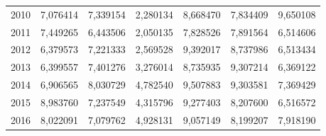\begin{table}
\begin{tabular}{p{1cm}p{2cm}p{2cm}p{2cm}p{2cm}p{2cm}p{2cm}}
 2010 &                               7,076414 &     7,339154 &                        2,280134 &             8,668470 &             7,834409 &                   9,650108 \\
 2011 &                               7,449265 &     6,443506 &                        2,050135 &             7,828526 &             7,891564 &                   6,514606 \\
 2012 &                               6,379573 &     7,221333 &                        2,569528 &             9,392017 &             8,737986 &                   6,513434 \\
 2013 &                               6,399557 &     7,401276 &                        3,276014 &             8,735935 &             9,307214 &                   6,369122 \\
 2014 &                               6,906565 &     8,030729 &                        4,782540 &             9,507883 &             9,303581 &                   7,369429 \\
 2015 &                               8,983760 &     7,237549 &                        4,315796 &             9,277403 &             8,207600 &                   6,516572 \\
 2016 &                               8,022091 &     7,079762 &                        4,928131 &             9,057149 &             8,199207 &                   7,918190 \\
\bottomrule
\end{tabular}
\end{table}
